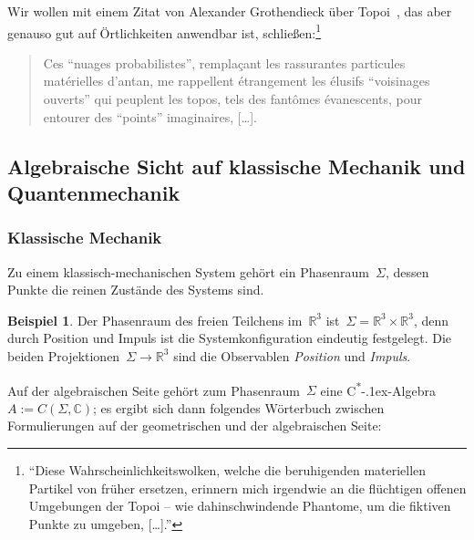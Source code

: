 \documentclass[a4paper,ngerman,12pt]{scrartcl}
\theoremstyle{definition}
\newtheorem{bsp}[defn]{Beispiel}
\theoremstyle{plain}
\theoremstyle{remark}
\newcommand{\RR}{\mathbb{R}}
\newcommand{\CC}{\mathbb{C}}
\newcommand{\csalgebra}{C\textsuperscript{*}\kern-.1ex-Algebra}
\renewcommand{\_}{\mathpunct{.}\,}
\newcommand{\?}{\,{:}\,}
\begin{document}
Wir wollen mit einem Zitat von Alexander Grothendieck über
Topoi~\cite{grothendieck:zitat}, das aber
genauso gut auf Örtlichkeiten anwendbar ist, schließen:\footnote{%
"`Diese \glq Wahrscheinlichkeitswolken\grq, welche die beruhigenden materiellen
Partikel von früher ersetzen, erinnern mich irgendwie an die flüchtigen
\glq offenen Umgebungen\grq{} der Topoi -- wie dahinschwindende Phantome, um
die fiktiven \glq Punkte\grq{} zu umgeben, [\ldots]."'}
\begin{quote}
Ces “nuages probabilistes”, remplaçant les rassurantes particules matérielles
d’antan, me rappellent étrangement les élusifs “voisinages ouverts” qui
peuplent les topos, tels des fantômes évanescents, pour entourer des “points”
imaginaires, [\ldots].
\end{quote}


\subsection{Algebraische Sicht auf klassische Mechanik und Quantenmechanik}

\subsubsection*{Klassische Mechanik}

Zu einem klassisch-mechanischen System gehört ein Phasenraum~$\Sigma$, dessen
Punkte die reinen Zustände des Systems sind.

\begin{bsp}Der Phasenraum des freien Teilchens im~$\RR^3$ ist~$\Sigma = \RR^3
\times \RR^3$, denn durch Position und Impuls ist die Systemkonfiguration
eindeutig festgelegt. Die beiden Projektionen~$\Sigma \to \RR^3$ sind die
Observablen \emph{Position} und \emph{Impuls}.\end{bsp}

Auf der algebraischen Seite gehört zum Phasenraum~$\Sigma$ eine \csalgebra~$A
:= C(\Sigma, \CC)$; es ergibt sich dann folgendes Wörterbuch zwischen
Formulierungen auf der geometrischen und der algebraischen Seite:
\end{document}

